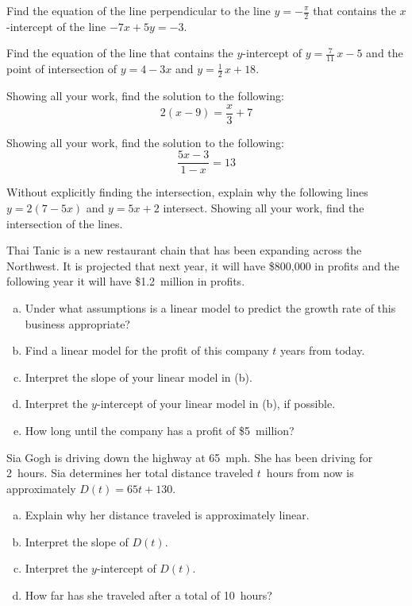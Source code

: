 \documentclass[12pt,letterpaper]{exam}
\begin{document}
\begin{questions}
\newpage
\question[10] Find the equation of the line perpendicular to the line $y= -\frac{\pi}{2}$ that contains the $x$-intercept of the line $-7x + 5y= -3$.



\newpage
\question[10] Find the equation of the line that contains the $y$-intercept of $y= \frac{7}{11}\,x - 5$ and the point of intersection of $y= 4 - 3x$ and $y= \frac{1}{2}\,x + 18$. 



\newpage
\question[10] Showing all your work, find the solution to the following:
	\[
	2(x - 9)= \frac{x}{3} + 7
	\]



\newpage
\question[10] Showing all your work, find the solution to the following:
	\[
	\dfrac{5x - 3}{1 - x}= 13
	\]



\newpage
\question[10] Without explicitly finding the intersection, explain why the following lines $y= 2(7 - 5x)$ and $y= 5x + 2$ intersect. Showing all your work, find the intersection of the lines. 



\newpage
\question[10] Thai Tanic is a new restaurant chain that has been expanding across the Northwest. It is projected that next year, it will have \$800,000 in profits and the following year it will have \$1.2~million in profits. 
	\begin{enumerate}[(a)]
	\item Under what assumptions is a linear model to predict the growth rate of this business appropriate?
	\item Find a linear model for the profit of this company $t$ years from today. 
	\item Interpret the slope of your linear model in (b).
	\item Interpret the $y$-intercept of your linear model in (b), if possible. 
	\item How long until the company has a profit of \$5~million? 
	\end{enumerate}



\newpage
\question[10] Sia Gogh is driving down the highway at 65~mph. She has been driving for 2~hours. Sia determines her total distance traveled $t$~hours from now is approximately $D(t)= 65t + 130$. 
	\begin{enumerate}[(a)]
	\item Explain why her distance traveled is approximately linear.
	\item Interpret the slope of $D(t)$.
	\item Interpret the $y$-intercept of $D(t)$. 
	\item How far has she traveled after a total of 10~hours?
	\end{enumerate}


\end{questions}
\end{document}
